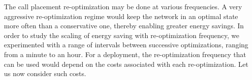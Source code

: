 %
%

The call placement re-optimization may be done at various frequencies. A very aggressive re-optimization regime would keep the network in an optimal state more often than a conservative one, thereby enabling greater energy savings. In order to study the scaling of energy saving with re-optimization frequency, we experimented with a range of intervals between successive optimizations, ranging from a minute to an hour. For a deployment, the re-optimization frequency that can be used would depend on the costs associated with each re-optimization. Let us now consider such costs.

